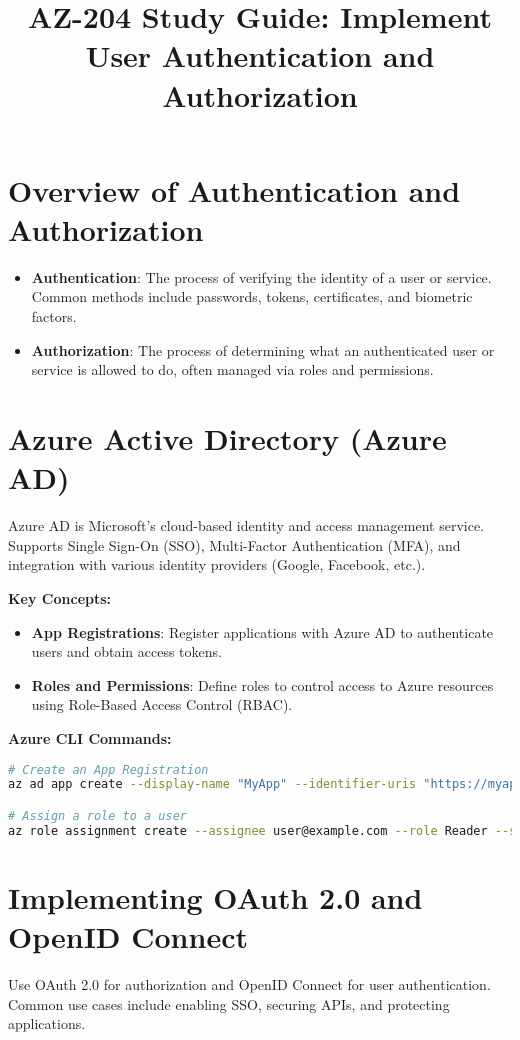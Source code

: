\documentclass{article}
\title{AZ-204 Study Guide: Implement User Authentication and Authorization}
\author{}
\date{}
\begin{document}
\maketitle

\section{Overview of Authentication and Authorization}
\begin{itemize}
    \item \textbf{Authentication}: The process of verifying the identity of a user or service. Common methods include passwords, tokens, certificates, and biometric factors.
    \item \textbf{Authorization}: The process of determining what an authenticated user or service is allowed to do, often managed via roles and permissions.
\end{itemize}

\section{Azure Active Directory (Azure AD)}
Azure AD is Microsoft’s cloud-based identity and access management service. Supports Single Sign-On (SSO), Multi-Factor Authentication (MFA), and integration with various identity providers (Google, Facebook, etc.).

\textbf{Key Concepts:}
\begin{itemize}
    \item \textbf{App Registrations}: Register applications with Azure AD to authenticate users and obtain access tokens.
    \item \textbf{Roles and Permissions}: Define roles to control access to Azure resources using Role-Based Access Control (RBAC).
\end{itemize}

\textbf{Azure CLI Commands:}
\begin{lstlisting}[language=bash]
# Create an App Registration
az ad app create --display-name "MyApp" --identifier-uris "https://myapp.example.com"

# Assign a role to a user
az role assignment create --assignee user@example.com --role Reader --scope /subscriptions/<subscription-id>/resourceGroups/MyResourceGroup
\end{lstlisting}

\section{Implementing OAuth 2.0 and OpenID Connect}
Use OAuth 2.0 for authorization and OpenID Connect for user authentication. Common use cases include enabling SSO, securing APIs, and protecting applications.
\end{document}
